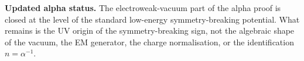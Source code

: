 \documentclass[12pt,a4paper]{article}
\begin{document}
\begin{resultbox}
\textbf{Updated alpha status.} The electroweak-vacuum part of the alpha proof is
closed at the level of the standard low-energy symmetry-breaking potential.
What remains is the UV origin of the symmetry-breaking sign, not the algebraic
shape of the vacuum, the EM generator, the charge normalisation, or the
identification $n=\alpha^{-1}$.
\end{resultbox}

\ifdefined\INCLUDEMODE\else
\end{document}
